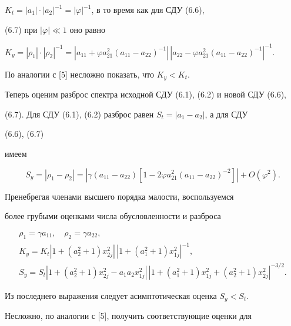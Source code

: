 $K_t=|a_1|\cdot|a_2|^{-1}=|\varphi|^{-1}$, в то время как для СДУ (6.6), 


(6.7) при $|\varphi|\ll 1$ оно равно 


$K_y=|\rho_1|\cdot|\rho_2|^{-1}=|a_{11}+\varphi 


a^2_{21}(a_{11}-a_{22})^{-1}|\, |a_{22}-\varphi 


a^2_{21}(a_{11}-a_{22})^{-1}|^{-1}$. 


 


По аналогии с [5] несложно показать, что $K_y<K_t$. 


 


Теперь оценим разброс спектра исходной СДУ (6.1), (6.2) и новой СДУ (6.6), 


(6.7). Для СДУ (6.1), (6.2) разброс равен $S_t=|a_1-a_2|$, а для СДУ 


(6.6), (6.7) 


имеем 


$$ 


S_y=|\rho_1-\rho_2|=|\gamma(a_{11}-a_{22})[1-2\varphi a^2_{21}(a_{11}- 


a_{22})^{-2}]|+O(\varphi^2). 


$$ 


 


Пренебрегая членами высшего порядка малости, воспользуемся 


более грубыми оценками числа обусловленности и разброса 


\begin{gather*} 


\rho_1=\gamma a_{11},\quad \rho_2=\gamma a_{22},\\ 


% 


K_y=K_t|1+(a^2_2+1)x^2_{2j}|\,|1+(a^2_1+1)x^2_{1j}|^{-1},\\ 


% 


S_y=S_t|1+(a^2_2+1)x^2_{2j}-a_1a_2x^2_{1j}|\,| 


1+(a^2_1+1)x^2_{1j}+(a^2_2+1)x^2_{2j}|^{-3/2}. 


\end{gather*} 


Из последнего выражения следует асимптотическая оценка $S_y<S_t$. 


 


Несложно, по аналогии с [5], получить соответствующие оценки для 


